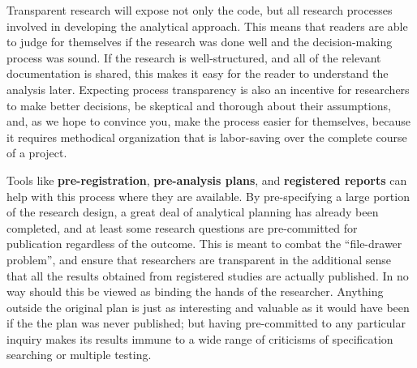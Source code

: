 Transparent research will expose not only the code,
but all research processes involved in developing the analytical approach.
This means that readers are able to judge for themselves if the research was done well
and the decision-making process was sound.
If the research is well-structured, and all of the relevant documentation
is shared, this makes it easy for the reader to understand the analysis later.
Expecting process transparency is also an incentive for researchers to make better decisions,
be skeptical and thorough about their assumptions,
and, as we hope to convince you, make the process easier for themselves,
because it requires methodical organization that is labor-saving over the complete course of a project.

Tools like \textbf{pre-registration},
\textbf{pre-analysis plans},
and \textbf{registered reports}
can help with this process where they are available.
By pre-specifying a large portion of the research design,
a great deal of analytical planning has already been completed,
and at least some research questions are pre-committed for publication regardless of the outcome.
This is meant to combat the ``file-drawer problem'',\cite{simonsohn2014p}
and ensure that researchers are transparent in the additional sense that
all the results obtained from registered studies are actually published.
In no way should this be viewed as binding the hands of the researcher.\cite{olken2015promises}
Anything outside the original plan is just as interesting and valuable
as it would have been if the the plan was never published;
but having pre-committed to any particular inquiry makes its results
immune to a wide range of criticisms of specification searching or multiple testing.

